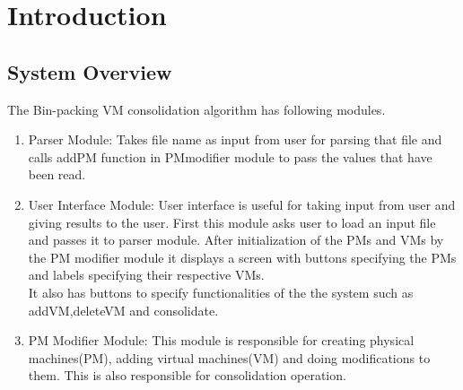 \documentclass{article}
\begin{document}
 \section{Introduction}
 \subsection{System Overview}
 The Bin-packing VM consolidation algorithm has following modules.
 \begin{enumerate}
  \item Parser Module: Takes file name as input from user for parsing that file and calls addPM function in PMmodifier module 
  to pass the values that have been read.
  \item User Interface Module: User interface is useful for taking input from  user and giving results to the user. First this module asks user to load an 
input file and passes it to parser module. After initialization of the PMs and VMs by the PM modifier module it displays a 
screen with buttons specifying the PMs and labels specifying their respective VMs.\\
It also has buttons to specify functionalities of the the system such as addVM,deleteVM and consolidate.
\item PM Modifier Module: This module is responsible for creating physical machines(PM), adding virtual machines(VM) and doing 
modifications to them. This is also responsible for consolidation operation.
 \end{enumerate}



 
\end{document}
